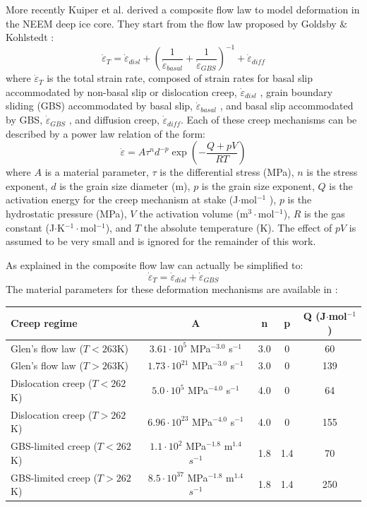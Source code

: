 More recently Kuiper et al. \cite{kuwd19,kudd19} derived a composite flow law 
to model deformation in the NEEM deep ice core. 
They start from the flow law proposed by Goldsby \& Kohlstedt \cite{goko01}:
\[
\dot{\varepsilon}_T = \dot{\varepsilon}_{disl} + 
\left(\frac{1}{ \dot{\varepsilon}_{basal}} + \frac{1}{ \dot{\varepsilon}_{GBS}} \right)^{-1} 
+  \dot{\varepsilon}_{diff}
\]
where $\dot{\varepsilon}_T$  is the total strain rate, 
composed of strain rates for basal slip accommodated by non-basal slip or dislocation creep,
$\dot{\varepsilon}_{disl}$ , grain boundary sliding (GBS) accommodated by basal slip, 
$\dot{\varepsilon}_{basal}$ , and basal slip accommodated by GBS, 
$\dot{\varepsilon}_{GBS}$ , and diffusion creep, 
$\dot{\varepsilon}_{diff}$. Each of these creep mechanisms can be described by a 
power law relation of the form:
\[
\dot{\varepsilon} = A \tau^n d^{-p} \exp \left( -\frac{Q+pV}{RT} \right)
\]
where $A$ is a material parameter, $\tau$ is the differential stress (MPa), 
$n$ is the stress exponent, $d$ is the grain size diameter (m), 
$p$ is the grain size exponent, $Q$ is the activation energy for the creep 
mechanism at stake (J$\cdot$mol$^{-1}$ ), $p$ is the hydrostatic pressure (MPa), 
$V$ the activation volume (m$^3\cdot$mol$^{-1}$), 
$R$ is the gas constant (J$\cdot$K$^{-1}\cdot$mol$^{-1}$), and $T$ the absolute temperature (K). 
The effect of $pV$ is assumed to be very small \cite{dust01} 
and is ignored for the remainder of this work.

As explained in \cite{kuwd19} the composite flow law can actually be simplified to:
\[
\dot{\varepsilon}_T = \dot{\varepsilon}_{disl} + \dot{\varepsilon}_{GBS}
\]
The material parameters for these deformation mechanisms are available in \cite{kudd19}:
\begin{center}
\begin{tabular}{lcccc}
\hline
Creep regime & A & n & p & Q (J$\cdot$mol$^{-1}$) \\
\hline\hline
Glen's flow law ($T<263$K) &$3.61\cdot10^5$ MPa$^{-3.0}$ s$^{-1}$ &3.0 &0 &60\\
Glen's flow law ($T>263$K) &$1.73\cdot10^{21}$ MPa$^{-3.0}$ s$^{-1}$ &3.0 &0 &139\\
\hline
Dislocation creep ($T<262$K) & $5.0\cdot10^5$ MPa$^{-4.0}$ s$^{-1}$ &4.0 &0 &64\\
Dislocation creep ($T>262$K) &$6.96\cdot 10^{23}$ MPa$^{-4.0}$ s$^{-1}$ &4.0 &0 &155\\
\hline
GBS-limited creep ($T<262$K) & $1.1\cdot 10^2$ MPa$^{-1.8}$ m$^{1.4}$ $s^{-1}$ &1.8 &1.4 &70\\
GBS-limited creep ($T>262$K) & $8.5\cdot10^{37}$ MPa$^{-1.8}$ m$^{1.4}$ $s^{-1}$ &1.8 &1.4 &250\\
\hline
\end{tabular}
\end{center}

